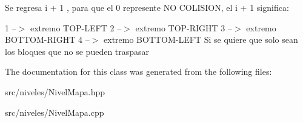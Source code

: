 Se regresa i + 1 , para que el 0 represente NO C\+O\+L\+I\+S\+I\+ON, el i + 1 significa\+:

1 --$>$ extremo T\+O\+P-\/\+L\+E\+FT 2 --$>$ extremo T\+O\+P-\/\+R\+I\+G\+HT 3 --$>$ extremo B\+O\+T\+T\+O\+M-\/\+R\+I\+G\+HT 4 --$>$ extremo B\+O\+T\+T\+O\+M-\/\+L\+E\+FT Si se quiere que solo sean los bloques que no se pueden traspasar 

The documentation for this class was generated from the following files\+:\begin{DoxyCompactItemize}
\item 
src/niveles/Nivel\+Mapa.\+hpp\item 
src/niveles/Nivel\+Mapa.\+cpp\end{DoxyCompactItemize}
